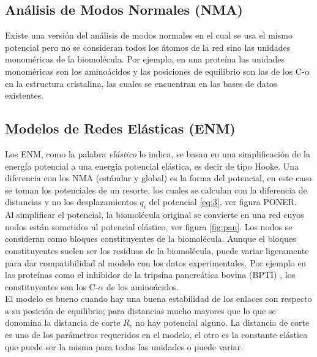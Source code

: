  \subsection{An\'{a}lisis de Modos Normales (NMA)}
 Existe una versi\'{o}n del an\'{a}lisis de modos normales en el cual se usa el mismo potencial pero no se consideran todos los \'{a}tomos de la red sino las unidades monom\'{e}ricas de la biomol\'{e}cula. Por ejemplo, en una prote\'{i}na las unidades monom\'{e}ricas son los amino\'{a}cidos y las posiciones de equilibrio son las de los C-$\alpha$ en la estructura cristalina, las cuales se encuentran en las bases de datos existentes.
\subsection{Modelos de Redes El\'{a}sticas (ENM)}
Los ENM, como la palabra \textit{el\'{a}stico} lo indica, se basan en una simplificaci\'{o}n de la energ\'{i}a potencial a una energ\'{i}a potencial el\'{a}stica, es decir de tipo Hooke.  Una diferencia con los NMA (est\'{a}ndar y global) es la forma del potencial, en este caso se toman los potenciales de un resorte, los cuales se calculan con la diferencia de distancias y no los desplazamientos $q_i$ del potencial \eqref{eq:3}, ver figura PONER. \\

Al simplificar el potencial, la biomol\'{e}cula original se convierte en una red cuyos nodos est\'{a}n sometidos al potencial el\'{a}stico, ver figura \ref{fig:pan}. Los nodos se consideran como bloques constituyentes de la biomol\'{e}cula. Aunque el bloques constituyentes suelen ser los residuos de la biomol\'{e}cula, puede variar ligeramente para dar compatibilidad al modelo con los datos experimentales. Por ejemplo en las prote\'{i}nas como el 
inhibidor de la tripsina pancreática bovina (BPTI) \cite{Gur2013}, los constituyentes son los C-$\alpha$ de los amino\'{a}cidos.\\

El modelo es bueno cuando hay una buena estabilidad de los enlaces con respecto a su posici\'{o}n de equilibrio; para distancias mucho mayores que lo que se donomina la distancia de corte $R_c$ no hay potencial alguno. La distancia de corte es uno de los par\'{a}metros requeridos en el modelo, el otro es la constante el\'{a}stica que puede ser la misma para todas las unidades o puede variar.\\

